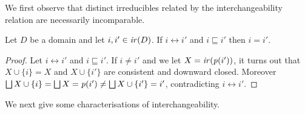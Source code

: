
  



We first observe that distinct irreducibles related by the
interchangeability relation are necessarily incomparable.
  

\begin{lemma}
  \label{le:inter-ord}
  Let $D$ be a domain and let $i, i' \in \mathop{\mathit{ir}({D})}$.
  If $i \leftrightarrow i'$ and $i \sqsubseteq i'$ then $i=i'$.
\end{lemma}

\begin{proof}

  Let $i \leftrightarrow i'$ and $i \sqsubseteq i'$. 
  If $i \neq i'$ and we let
  $X = \mathop{\mathit{ir}({\mathit{p}({i'})})}$, it turns out that $X \cup \{i\} = X$ and
  $X \cup \{i'\}$ are consistent and downward closed. Moreover
  $\bigsqcup X \cup \{i\} = \bigsqcup X = \mathit{p}({i'}) \neq \bigsqcup X
  \cup \{i'\} = i'$, contradicting $i \leftrightarrow i'$.
\end{proof}

We next give some characterisations of interchangeability.

